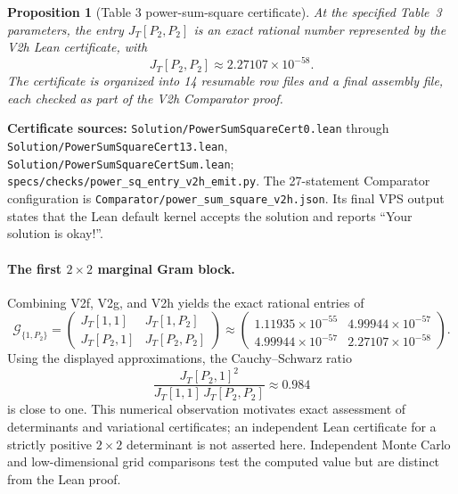 \documentclass[11pt]{article}
\newtheorem{proposition}[theorem]{Proposition}
\begin{document}
\begin{proposition}[Table 3 power-sum-square certificate]\label{prop:p2squarecert}
At the specified Table~3 parameters, the entry $J_T[P_2,P_2]$ is an
exact rational number represented by the V2h Lean certificate, with
\[
 J_T[P_2,P_2]\approx 2.27107\times10^{-58}.
\]
The certificate is organized into 14 resumable row files and a final
assembly file, each checked as part of the V2h Comparator proof.
\end{proposition}
\noindent\textbf{Certificate sources:}
\nolinkurl{Solution/PowerSumSquareCert0.lean} through\newline
\nolinkurl{Solution/PowerSumSquareCert13.lean},\newline
\nolinkurl{Solution/PowerSumSquareCertSum.lean};\newline
\nolinkurl{specs/checks/power_sq_entry_v2h_emit.py}.
The 27-statement Comparator configuration is
\nolinkurl{Comparator/power_sum_square_v2h.json}.
Its final VPS output states that the Lean default kernel accepts the
solution and reports ``Your solution is okay!''.

\paragraph{The first $2\times2$ marginal Gram block.}
Combining V2f, V2g, and V2h yields the exact rational entries of
\[
 \mathcal G_{\{1,P_2\}}=
 \begin{pmatrix}
  J_T[1,1] & J_T[1,P_2]\\
  J_T[P_2,1] & J_T[P_2,P_2]
 \end{pmatrix}
 \approx
 \begin{pmatrix}
  1.11935\times10^{-55} & 4.99944\times10^{-57}\\
  4.99944\times10^{-57} & 2.27107\times10^{-58}
 \end{pmatrix}.
\]
Using the displayed approximations, the Cauchy--Schwarz ratio
\[
 \frac{J_T[P_2,1]^2}{J_T[1,1]\,J_T[P_2,P_2]}\approx0.984
\]
is close to one. This numerical observation motivates exact assessment
of determinants and variational certificates; an independent Lean
certificate for a strictly positive $2\times2$ determinant is not
asserted here. Independent Monte Carlo and low-dimensional grid
comparisons test the computed value but are distinct from the Lean proof.
\end{document}
